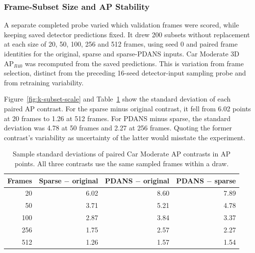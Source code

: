 \subsubsection{Frame-Subset Size and AP Stability}
\label{sec:k-subset-scale}

A separate completed probe varied which validation frames were scored,
while keeping saved detector predictions fixed. It drew 200 subsets
without replacement at each size of 20, 50, 100, 256 and 512 frames,
using seed 0 and paired frame identities for the original, sparse and
sparse-PDANS inputs. Car Moderate 3D AP$_{R40}$ was recomputed from the
saved predictions. This is variation from frame selection, distinct
from the preceding 16-seed detector-input sampling probe and from
retraining variability.

Figure~\ref{fig:k-subset-scale} and Table~\ref{tab:k-subset-scale} show
the standard deviation of each paired AP contrast. For the sparse
minus original contrast, it fell from 6.02 points at 20 frames to
1.26 at 512 frames. For PDANS minus sparse, the standard deviation was
4.78 at 50 frames and 2.27 at 256 frames. Quoting the former contrast's
variability as uncertainty of the latter would misstate the experiment.


\begin{table}[!t]\centering\setlength{\tabcolsep}{5pt}
\begin{tabular}{rrrr}\toprule
Frames & Sparse $-$ original & PDANS $-$ original & PDANS $-$ sparse\\\midrule

20 & 6.02 & 8.60 & 7.89\\

50 & 3.71 & 5.21 & 4.78\\

100 & 2.87 & 3.84 & 3.37\\

256 & 1.75 & 2.57 & 2.27\\

512 & 1.26 & 1.57 & 1.54\\

\bottomrule\end{tabular}
\caption{Sample standard deviations of paired Car Moderate AP contrasts
in AP points. All three contrasts use the same sampled frames within
a draw.}\label{tab:k-subset-scale}\end{table}

